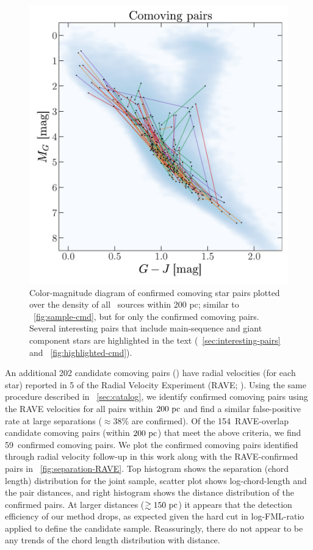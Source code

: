 \documentclass[modern, letterpaper]{aastex61}
\newcommand{\DR}[1]{\acronym{DR}#1}
\newcommand{\tgas}{\acronym{TGAS}}
\newcommand{\nraveoverlap}{154}
\newcommand{\nravecomoving}{59}
\begin{document}
\begin{figure}[htbp]
  \begin{center}
    \includegraphics[width=0.8\linewidth]{genuine_cmd.pdf}
  \end{center}
  \caption{%
    Color-magnitude diagram of confirmed comoving star pairs plotted over
    the density of all \tgas\ sources within 200 pc; similar to
    \figurename~\ref{fig:sample-cmd}, but for only the confirmed comoving pairs.
    Several interesting pairs that include main-sequence and giant component
    stars are highlighted in the text
    (\sectionname~\ref{sec:interesting-pairs} and
    \figurename~\ref{fig:highlighted-cmd}).
    \label{fig:genuine-cmd}}
\end{figure}

An additional 202 candidate comoving pairs (\citealt{Oh:2017}) have radial
velocities (for each star) reported in \DR{5} of the Radial Velocity Experiment
(RAVE; \citealt{Kunder:2017}).
Using the same procedure described in \sectionname~\ref{sec:catalog}, we
identify confirmed comoving pairs using the RAVE velocities for all pairs within
$200~\mathrm{pc}$ and find a similar false-positive rate at large separations ($\approx
38\%$ are confirmed).
Of the \nraveoverlap\ RAVE-overlap candidate comoving pairs (within $200~\mathrm{pc}$)
that meet the above criteria, we find \nravecomoving\ confirmed comoving pairs.
We plot the confirmed comoving pairs identified through radial velocity
follow-up in this work along with the RAVE-confirmed pairs in
\figurename~\ref{fig:separation-RAVE}.
Top histogram shows the separation (chord length) distribution for the joint
sample, scatter plot shows log-chord-length and the pair distances, and right
histogram shows the distance distribution of the confirmed pairs.
At larger distances ($\gtrsim 150~\mathrm{pc}$) it appears that the detection efficiency
of our method drops, as expected given the hard cut in log-FML-ratio applied to
define the candidate sample.
Reassuringly, there do not appear to be any trends of the chord length
distribution with distance.
\end{document}
